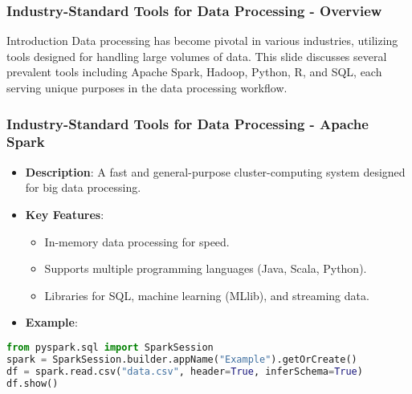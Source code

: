 \documentclass[aspectratio=169]{beamer}
\begin{document}
\begin{frame}[fragile]
    \frametitle{Industry-Standard Tools for Data Processing - Overview}
    \begin{block}{Introduction}
        Data processing has become pivotal in various industries, utilizing tools designed for handling large volumes of data. This slide discusses several prevalent tools including Apache Spark, Hadoop, Python, R, and SQL, each serving unique purposes in the data processing workflow.
    \end{block}
\end{frame}

\begin{frame}[fragile]
    \frametitle{Industry-Standard Tools for Data Processing - Apache Spark}
    \begin{itemize}
        \item \textbf{Description}: A fast and general-purpose cluster-computing system designed for big data processing.
        \item \textbf{Key Features}:
          \begin{itemize}
              \item In-memory data processing for speed.
              \item Supports multiple programming languages (Java, Scala, Python).
              \item Libraries for SQL, machine learning (MLlib), and streaming data.
          \end{itemize}
        \item \textbf{Example}:
        \end{itemize}
        
        \begin{lstlisting}[language=Python]
from pyspark.sql import SparkSession
spark = SparkSession.builder.appName("Example").getOrCreate()
df = spark.read.csv("data.csv", header=True, inferSchema=True)
df.show()
        \end{lstlisting}
\end{frame}
\end{document}
